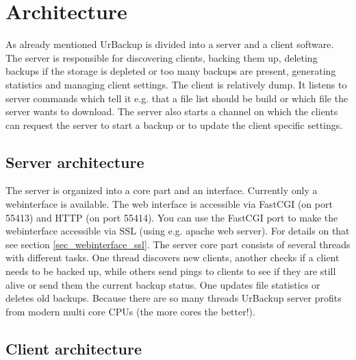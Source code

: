 \documentclass[a4paper,10pt]{article}
\begin{document}
\section{Architecture}
\label{sec_architecture}

As already mentioned UrBackup is divided into a server and a client software.
The server is responsible for discovering clients, backing them up, deleting
backups if the storage is depleted or too many backups are present, generating
statistics and managing client settings. The client is relatively dump. It
listens to server commands which tell it e.g. that a file list should be build
or which file the server wants to download. The server also starts a channel on
which the clients can request the server to start a backup or to update the
client specific settings.

\subsection{Server architecture}

The server is organized into a core part and an interface. Currently only a
webinterface is available. The web interface is accessible via FastCGI (on port
55413) and HTTP (on port 55414). You can use the FastCGI port to make the
webinterface accessible via SSL (using e.g. apache web server). For details on
that see section \ref{sec_webinterface_ssl}. The server core part consists of
several threads with different tasks. One thread discovers new clients, another
checks if a client needs to be backed up, while others send pings to clients to
see if they are still alive or send them the current backup status. One updates
file statistics or deletes old backups. Because there are so many threads
UrBackup server profits from modern multi core CPUs (the more cores the
better!).

\subsection{Client architecture}
\end{document}
